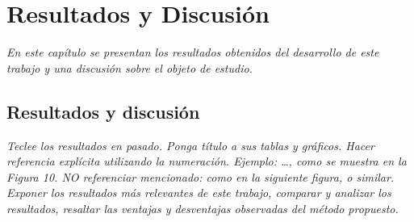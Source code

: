 \chapter{Resultados y Discusión}
\label{ch:results-discussion}

\textit{En este capítulo se presentan los resultados obtenidos del desarrollo de este trabajo y una discusión sobre el objeto de estudio.}

\newpage

\section{Resultados y discusión}

\textit{Teclee los resultados en pasado. Ponga título a sus tablas y gráficos. Hacer referencia explícita utilizando la numeración. Ejemplo: …, como se muestra en la Figura 10. NO referenciar mencionado: como en la siguiente figura, o similar. Exponer los resultados más relevantes de este trabajo, comparar y analizar los resultados, resaltar las ventajas y desventajas observadas del método propuesto.}
